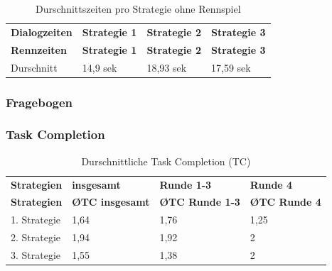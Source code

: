 \documentclass[12pt,a4paper]{scrartcl}
\begin{document}
\begin{longtable}{p{3cm}p{3cm}p{3cm}p{3cm} }
	\label{DialogzeitenKCL}\\
	\caption[Durschnittszeiten pro Strategie ohne Rennspiel]{Durschnittszeiten pro Strategie ohne Rennspiel}\\
	\hline
	\textbf{Dialogzeiten}&\textbf{Strategie 1}&\textbf{Strategie 2} &\textbf{Strategie 3}\\
	\hline
	\endfirsthead
	\hline
	\textbf{Rennzeiten}&\textbf{Strategie 1}&\textbf{Strategie 2} &\textbf{Strategie 3}\\
	\hline
	\endhead
Durschnitt &  14,9 sek & 18,93 sek & 17,59 sek \\


\hline
\end{longtable}
\subsubsection{Fragebogen}
\subsubsection{Task Completion}
\begin{longtable}{p{3cm}p{3cm}p{3cm}p{3cm} }
	\label{Dialogzeiten}\\
	\caption[Durschnittliche Task Completion (TC)]{Durschnittliche Task Completion (TC)}\\
	\hline
	\textbf{Strategien}&\textbf{insgesamt}&\textbf{Runde 1-3} &\textbf{Runde 4}\\
	\hline
	\endfirsthead
	\hline
	\textbf{Strategien}&\textbf{\O TC insgesamt}&\textbf{\O TC Runde 1-3} &\textbf{\O TC Runde 4}\\
	\hline
	\endhead
1. Strategie & 1,64 & 1,76 & 1,25  \\
2. Strategie & 1,94 & 1,92 & 2  \\
3. Strategie & 1,55 & 1,38 & 2  \\
\hline
\end{longtable}
\end{document}
